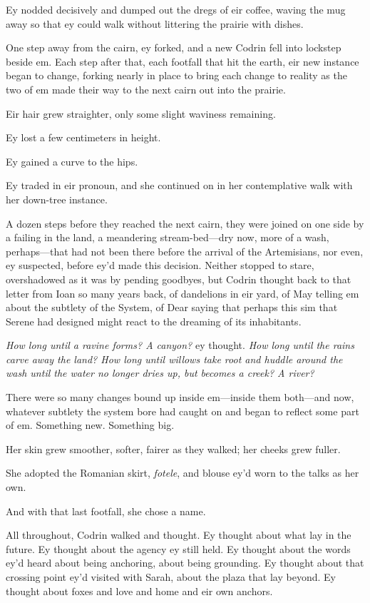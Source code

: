 Ey nodded decisively and dumped out the dregs of eir coffee, waving the mug away so that ey could walk without littering the prairie with dishes.

One step away from the cairn, ey forked, and a new Codrin fell into lockstep beside em. Each step after that, each footfall that hit the earth, eir new instance began to change, forking nearly in place to bring each change to reality as the two of em made their way to the next cairn out into the prairie.

Eir hair grew straighter, only some slight waviness remaining.

Ey lost a few centimeters in height.

Ey gained a curve to the hips.

Ey traded in eir pronoun, and she continued on in her contemplative walk with her down-tree instance.

A dozen steps before they reached the next cairn, they were joined on one side by a failing in the land, a meandering stream-bed—dry now, more of a wash, perhaps—that had not been there before the arrival of the Artemisians, nor even, ey suspected, before ey'd made this decision. Neither stopped to stare, overshadowed as it was by pending goodbyes, but Codrin thought back to that letter from Ioan so many years back, of dandelions in eir yard, of May telling em about the subtlety of the System, of Dear saying that perhaps this sim that Serene had designed might react to the dreaming of its inhabitants.

\emph{How long until a ravine forms? A canyon?} ey thought. \emph{How long until the rains carve away the land? How long until willows take root and huddle around the wash until the water no longer dries up, but becomes a creek? A river?}

There were so many changes bound up inside em—inside them both—and now, whatever subtlety the system bore had caught on and began to reflect some part of em. Something new. Something big.

Her skin grew smoother, softer, fairer as they walked; her cheeks grew fuller.

She adopted the Romanian skirt, \emph{fotele}, and blouse ey'd worn to the talks as her own.

And with that last footfall, she chose a name.

All throughout, Codrin walked and thought. Ey thought about what lay in the future. Ey thought about the agency ey still held. Ey thought about the words ey'd heard about being anchoring, about being grounding. Ey thought about that crossing point ey'd visited with Sarah, about the plaza that lay beyond. Ey thought about foxes and love and home and eir own anchors.

